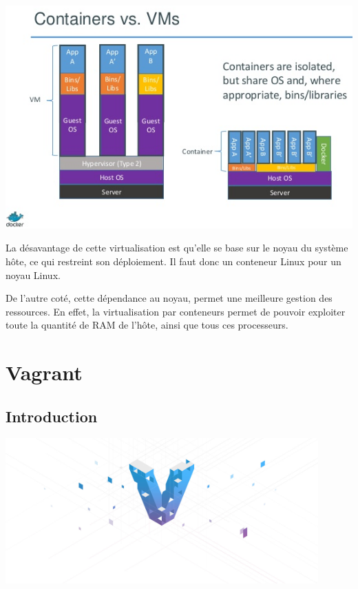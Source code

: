 \documentclass[12pt,a4paper]{article}
\begin{document}
\begin{center}
  \includegraphics[width=15cm]{images_rapport/vm_container.jpg}
\end{center}

La désavantage de cette virtualisation est qu'elle se base sur le noyau du système hôte, ce qui restreint son déploiement. Il faut donc un conteneur Linux pour un noyau Linux. 

De l'autre coté, cette dépendance au noyau, permet une meilleure gestion des ressources. En effet, la virtualisation par conteneurs permet de pouvoir exploiter toute la quantité de RAM de l'hôte, ainsi que tous ces processeurs.

\section{Vagrant}

\subsection{Introduction}
\begin{center}
  \includegraphics[width=12cm]{images_rapport/vagrant_logo.jpg}
\end{center}
\end{document}
